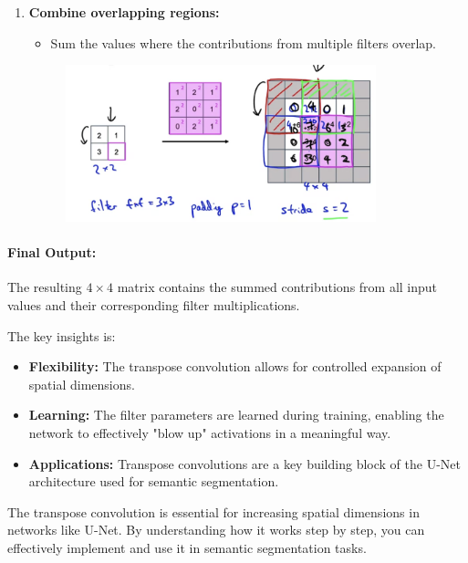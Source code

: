 \documentclass[letterpaper,12pt,notitlepage,twoside]{report}
\begin{document}
\begin{enumerate}
    \item \textbf{Combine overlapping regions:}
    \begin{itemize}
        \item Sum the values where the contributions from multiple filters overlap.
    \end{itemize}
	\begin{figure}[h]
		\centering
		\includegraphics[width=0.85\textwidth]{Images/Transpose Convolution - Final Step.png}
		\label{fig:50}
	\end{figure}
	\FloatBarrier
\end{enumerate}

\paragraph{Final Output:} The resulting $4 \times 4$ matrix contains the summed contributions from all input values and their corresponding filter multiplications.

The key insights is:
\begin{itemize}[nosep]
    \item \textbf{Flexibility:} The transpose convolution allows for controlled expansion of spatial dimensions.
    \item \textbf{Learning:} The filter parameters are learned during training, enabling the network to effectively "blow up" activations in a meaningful way.
    \item \textbf{Applications:} Transpose convolutions are a key building block of the U-Net architecture used for semantic segmentation.
\end{itemize}

The transpose convolution is essential for increasing spatial dimensions in networks like U-Net. By understanding how it works step by step, you can effectively implement and use it in semantic segmentation tasks. 

\end{document}
